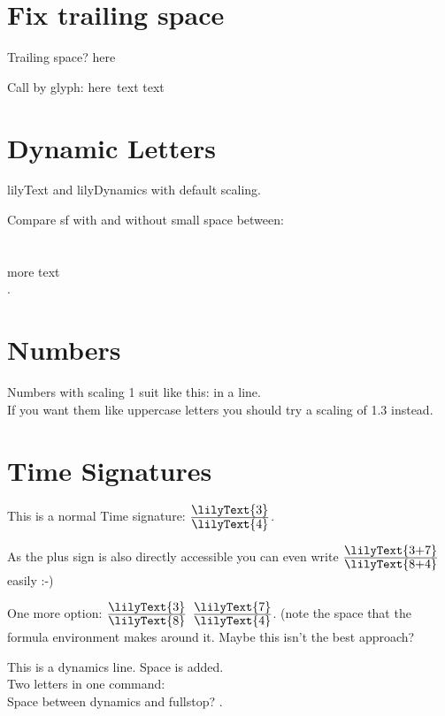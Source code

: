 \documentclass{scrartcl}
\newcommand*{\lilyTimeSignature}[2]{$\frac{\mbox{\lilyText{#1}}}{\mbox{\lilyText{#2}}}$}
\begin{document}
\section*{Fix trailing space}
Trailing space?  here

Call by glyph:  here\
\flat* text \flat text




\section*{Dynamic Letters}
{	\LARGE
}	
	
	lilyText  and lilyDynamics  with default scaling.
	
	Compare sf with and without small space between:\\
	\\
	\\
	\lilyRF* more text\\
	\lilyRFZ.
	
\section*{Numbers}
Numbers with scaling 1 suit like this:  in a line.\\
If you want them like uppercase letters you should try a scaling of  1.3 instead.

\section*{Time Signatures}
	This is a normal Time signature: \lilyTimeSignature{3}{4}.
	
	As the plus sign is also directly accessible you can even
	write \lilyTimeSignature{3+7}{8+4} easily :-)
	
	One more option: \lilyTimeSignature{3}{8} \lilyText{+} \lilyTimeSignature{7}{4}. (note the space that the formula environment makes around it. Maybe this isn't the best approach?

	This is a dynamics  line. Space is added.\\
	Two letters in one command: \lilyText[scale=1.4]{sf}\\
	Space between dynamics and fullstop? .\\
	
	
\end{document}

